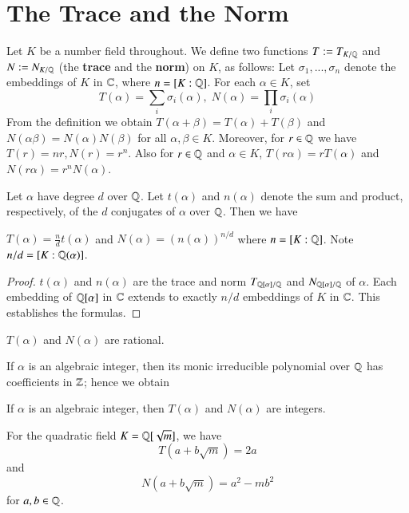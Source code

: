 \section{The Trace and the Norm}
\label{sec:TrNorm}

Let $K$ be a number field throughout. We define two functions $T := T_{K/\mathbb Q}$ and $N := N_{K/\mathbb Q}$ (the \textbf{trace} and the \textbf{norm}) on $K$, as follows: Let $\sigma_1,...,\sigma_n$ denote the embeddings of $K$ in $\mathbb C$, where $n = [K:\mathbb Q]$. For each $\alpha \in K$, set $$T(\alpha) = \sum_i\sigma_i(\alpha),\; N(\alpha) = \prod_i\sigma_i(\alpha)$$
From the definition we obtain $T(\alpha+\beta) = T(\alpha)+T(\beta)$ and $N(\alpha\beta) = N(\alpha)N(\beta)$ for all $\alpha,\beta \in K$. Moreover, for $r \in \mathbb Q$ we have $T(r) = nr, N(r) = r^n$. Also for $r \in \mathbb Q$ and $\alpha \in K$, $T(r\alpha) = rT(\alpha)$ and $N(r\alpha) = r^nN(\alpha)$.

Let $\alpha$ have degree $d$ over $\mathbb Q$. Let $t(\alpha)$ and $n(\alpha)$ denote the sum and product, respectively, of the $d$ conjugates of $\alpha$ over $\mathbb Q$. Then we have 

\begin{thm}
    $T(\alpha) = \frac{n}{d}t(\alpha)$ and $N(\alpha) = (n(\alpha))^{n/d}$ where $n = [K:\mathbb Q]$. Note $n/d = [K:\mathbb Q(\alpha)]$.
\end{thm}
\begin{proof}
    $t(\alpha)$ and $n(\alpha)$ are the trace and norm $T_{\mathbb Q[\alpha]/\mathbb Q}$ and $N_{\mathbb Q[\alpha]/\mathbb Q}$ of $\alpha$. Each embedding of $\mathbb Q[\alpha]$ in $\mathbb C$ extends to exactly $n/d$ embeddings of $K$ in $\mathbb C$. This establishes the formulas.
\end{proof}


\begin{cor}
    $T(\alpha)$ and $N(\alpha)$ are rational.
\end{cor}

If $\alpha$ is an algebraic integer, then its monic irreducible polynomial over $\mathbb Q$ has coefficients in $\mathbb Z$; hence we obtain
\begin{cor}
    If $\alpha$ is an algebraic integer, then $T(\alpha)$ and $N(\alpha)$ are integers.
\end{cor}

\begin{eg}
    For the quadratic field $K = \mathbb Q[\sqrt{m}]$, we have $$T(a+b\sqrt{m}) = 2a$$
    and $$N(a+b\sqrt{m}) = a^2-mb^2$$
    for $a,b \in \mathbb Q$.
\end{eg}





